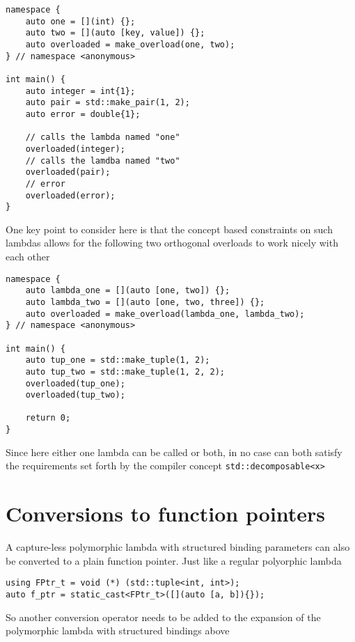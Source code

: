 \documentclass{article}
\begin{document}
\begin{lstlisting}
namespace {
    auto one = [](int) {};
    auto two = [](auto [key, value]) {};
    auto overloaded = make_overload(one, two);
} // namespace <anonymous>

int main() {
    auto integer = int{1};
    auto pair = std::make_pair(1, 2);
    auto error = double{1};

    // calls the lambda named "one"
    overloaded(integer);
    // calls the lamdba named "two"
    overloaded(pair);
    // error
    overloaded(error);
}
\end{lstlisting}

One key point to consider here is that the concept based constraints on such
lambdas allows for the following two orthogonal overloads to work nicely with
each other

\begin{lstlisting}
namespace {
    auto lambda_one = [](auto [one, two]) {};
    auto lambda_two = [](auto [one, two, three]) {};
    auto overloaded = make_overload(lambda_one, lambda_two);
} // namespace <anonymous>

int main() {
    auto tup_one = std::make_tuple(1, 2);
    auto tup_two = std::make_tuple(1, 2, 2);
    overloaded(tup_one);
    overloaded(tup_two);

    return 0;
}
\end{lstlisting}

Since here either one lambda can be called or both, in no case can both
satisfy the requirements set forth by the compiler concept
\texttt{std::decomposable<x>}


\section{Conversions to function pointers}
A capture-less polymorphic lambda with structured binding parameters can also
be converted to a plain function pointer.  Just like a regular polyorphic
lambda

\begin{lstlisting}
using FPtr_t = void (*) (std::tuple<int, int>);
auto f_ptr = static_cast<FPtr_t>([](auto [a, b]){});
\end{lstlisting}

So another conversion operator needs to be added to the expansion of the
polymorphic lambda with structured bindings above
\end{document}
